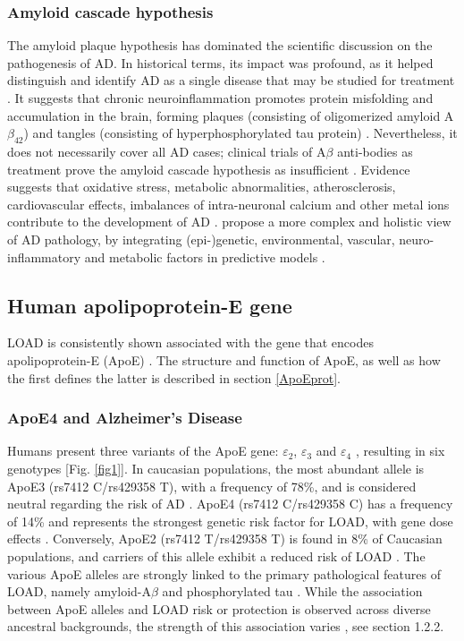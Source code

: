 \documentclass{amsart}
\begin{document}
\subsubsection{Amyloid cascade hypothesis}
The amyloid plaque hypothesis has dominated the scientific discussion on the pathogenesis of AD. In historical terms, its impact was profound, as it helped distinguish and identify AD as a single disease that may be studied for treatment \cite{Hardy2006AlzheimersReappraisal}. It suggests that chronic neuroinflammation promotes protein misfolding and accumulation in the brain, forming plaques (consisting of oligomerized amyloid A$\beta_{42}$) and tangles (consisting of hyperphosphorylated tau protein) \cite{Edwards2019ANeurodegeneration}. Nevertheless, it does not necessarily cover all AD cases; clinical trials of A$\beta$ anti-bodies as treatment prove the amyloid cascade hypothesis as insufficient \cite{Kepp2023TheReview,Kurkinen2023TheThinking}. Evidence suggests that oxidative stress, metabolic abnormalities, atherosclerosis, cardiovascular effects, imbalances of intra-neuronal calcium and other metal ions contribute to the development of AD \cite{Kepp2023TheReview}. \citeauthor{Kepp2023TheReview} propose a more complex and holistic view of AD pathology, by integrating (epi-)genetic, environmental, vascular, neuro-inflammatory and metabolic factors in predictive models \cite{Kepp2023TheReview}.

\subsection{Human apolipoprotein-E gene}
LOAD is consistently shown associated with the gene that encodes apolipoprotein-E (ApoE) \cite{Corder1993GeneFamilies}. The structure and function of ApoE, as well as how the first defines the latter is described in section \ref{ApoEprot}.

\subsubsection{ApoE4 and Alzheimer's Disease}
Humans present three variants of the ApoE gene: $\varepsilon_2$, $\varepsilon_3$ and $\varepsilon_4$ \cite{Husain2021APOETherapeutics, Yang2023ApolipoproteinDisease}, resulting in six genotypes [Fig. \ref{fig1}]. In caucasian populations, the most abundant allele is ApoE3 (rs7412 C/rs429358 T), with a frequency of 78\%, and is considered neutral regarding the risk of AD \cite{Liu2013ApolipoproteinTherapy}. ApoE4 (rs7412 C/rs429358 C) has a frequency of 14\% and represents the strongest genetic risk factor for LOAD, with gene dose effects \cite{Strittmatter1993ApolipoproteinDisease}. Conversely, ApoE2 (rs7412 T/rs429358 T) is found in 8\% of Caucasian populations, and carriers of this allele exhibit a reduced risk of LOAD \cite{Liu2013ApolipoproteinTherapy}. The various ApoE alleles are strongly linked to the primary pathological features of LOAD, namely amyloid-A$\beta$ and phosphorylated tau \cite{Deming2017Genome-wideModifiers}. While the association between ApoE alleles and LOAD risk or protection is observed across diverse ancestral backgrounds, the strength of this association varies \cite{Belloy2019AForward, Farrer1997EffectsMeta-analysis}, see section 1.2.2.
\end{document}
